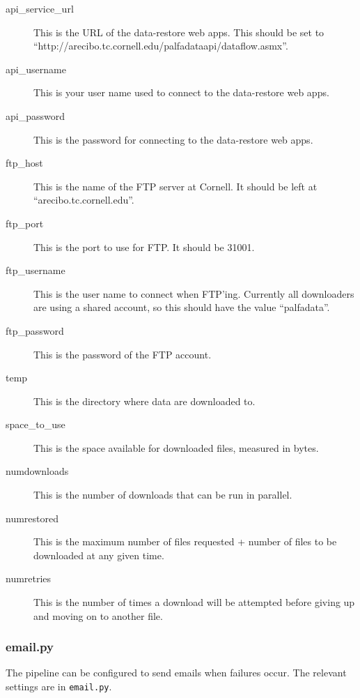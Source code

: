 \documentclass[12pt]{article}
\begin{document}
\begin{description}
    \item[api\_service\_url] This is the URL of the data-restore web apps. This should be set to ``http://arecibo.tc.cornell.edu/palfadataapi/dataflow.asmx''.
    \item[api\_username] This is your user name used to connect to the data-restore web apps.
    \item[api\_password] This is the password for connecting to the data-restore web apps.
    \item[ftp\_host] This is the name of the FTP server at Cornell. It should be left at ``arecibo.tc.cornell.edu''.
    \item[ftp\_port] This is the port to use for FTP. It should be 31001.
    \item[ftp\_username] This is the user name to connect when FTP'ing. Currently all downloaders are using a shared account, so this should have the value ``palfadata''.
    \item[ftp\_password] This is the password of the FTP account.
    \item[temp] This is the directory where data are downloaded to.
    \item[space\_to\_use] This is the space available for downloaded files, measured in bytes.
    \item[numdownloads] This is the number of downloads that can be run in parallel.
    \item[numrestored] This is the maximum number of files requested + number of files to be downloaded at any given time.
    \item[numretries] This is the number of times a download will be attempted before giving up and moving on to another file.
\end{description}


\subsubsection{email.py}
The pipeline can be configured to send emails when failures occur. The relevant settings are in \texttt{email.py}.
\end{document}
